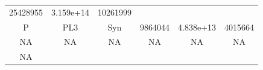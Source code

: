 \documentclass[]{article}
\begin{document}
\begin{longtable}[]{@{}cccccc@{}}
\begin{minipage}[t]{0.10\columnwidth}
25428955
\strut\end{minipage} &
\begin{minipage}[t]{0.12\columnwidth}\centering\strut
3.159e+14
\strut\end{minipage} &
\begin{minipage}[t]{0.12\columnwidth}\centering\strut
10261999
\strut\end{minipage}\tabularnewline
\begin{minipage}[t]{0.07\columnwidth}\centering\strut
P
\strut\end{minipage} &
\begin{minipage}[t]{0.07\columnwidth}\centering\strut
PL3
\strut\end{minipage} &
\begin{minipage}[t]{0.12\columnwidth}\centering\strut
Syn
\strut\end{minipage} &
\begin{minipage}[t]{0.10\columnwidth}\centering\strut
9864044
\strut\end{minipage} &
\begin{minipage}[t]{0.12\columnwidth}\centering\strut
4.838e+13
\strut\end{minipage} &
\begin{minipage}[t]{0.12\columnwidth}\centering\strut
4015664
\strut\end{minipage}\tabularnewline
\begin{minipage}[t]{0.07\columnwidth}\centering\strut
NA
\strut\end{minipage} &
\begin{minipage}[t]{0.07\columnwidth}\centering\strut
NA
\strut\end{minipage} &
\begin{minipage}[t]{0.12\columnwidth}\centering\strut
NA
\strut\end{minipage} &
\begin{minipage}[t]{0.10\columnwidth}\centering\strut
NA
\strut\end{minipage} &
\begin{minipage}[t]{0.12\columnwidth}\centering\strut
NA
\strut\end{minipage} &
\begin{minipage}[t]{0.12\columnwidth}\centering\strut
NA
\strut\end{minipage}\tabularnewline
\begin{minipage}[t]{0.07\columnwidth}\centering\strut
NA
\strut\end{minipage} &
\begin{minipage}[t]{0.07\columnwidth}\centering\strut

\end{minipage}
\end{longtable}
\end{document}
